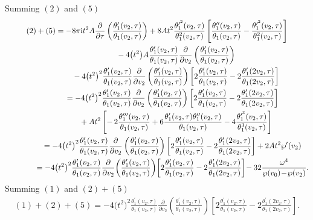 \documentclass[10pt,a4paper]{amsart}
\numberwithin{equation}{section}
\begin{document}
Summing $(2)$ and $(5)$
\begin{gather*}
(2)+(5)=-8\pi {\rm i}t^2A\frac{\partial}{\partial \tau}\left(\frac{\theta_1^{\prime}(v_2,\tau)}{\theta_1(v_2,\tau)}\right) +8At^2\frac{\theta_1^{\prime^2}(v_2,\tau)}{\theta_1^2(v_2,\tau)} \left[\frac{\theta_1^{\prime\prime}(v_2,\tau)}{\theta_1(v_2,\tau)} -\frac{\theta_1^{\prime^2}(v_2,\tau)}{\theta_1^2(v_2,\tau)}\right]
\\ \hphantom{(2)+(5)=}
-4\big(t^2\big)A\frac{\theta_1^{\prime}(v_2,\tau)}{\theta_1(v_2,\tau)}\frac{\partial}{\partial v_2}\left(\frac{\theta_1^{\prime}(v_2,\tau)}{\theta_1(v_2,\tau)}\right)
\\ \hphantom{(2)+(5)=}
-4\big(t^2\big)^2\frac{\theta_1^{\prime}(v_2,\tau)}{\theta_1(v_2,\tau)}\frac{\partial}{\partial v_2}\left(\frac{\theta_1^{\prime}(v_2,\tau)}{\theta_1(v_2,\tau)}\right)\left[ 2\frac{\theta_1^{\prime}(v_2,\tau)}{\theta_1(v_2,\tau)} -2\frac{\theta_1^{\prime}(2v_2,\tau)}{\theta_1(2v_2,\tau)}\right]
\\ \hphantom{(2)+(5)}
=-4\big(t^2\big)^2\frac{\theta_1^{\prime}(v_2,\tau)}{\theta_1(v_2,\tau)}\frac{\partial}{\partial v_2}\left(\frac{\theta_1^{\prime}(v_2,\tau)}{\theta_1(v_2,\tau)}\right)\left[ 2\frac{\theta_1^{\prime}(v_2,\tau)}{\theta_1(v_2,\tau)} -2\frac{\theta_1^{\prime}(2v_2,\tau)}{\theta_1(2v_2,\tau)}\right]
\\ \hphantom{(2)+(5)=}
+At^2\left[{-}\,2\frac{\theta_1^{\prime\prime\prime}(v_2,\tau)}{\theta_1(v_2,\tau)} +6\frac{\theta_1^{\prime}(v_2,\tau)\theta_1^{\prime\prime}(v_2,\tau)}{\theta_1(v_2,\tau)} -4\frac{\theta_1^{\prime^3}(v_2,\tau)}{\theta^3_1(v_2,\tau)}\right]
\\ \hphantom{(2)+(5)}
=-4\big(t^2\big)^2\frac{\theta_1^{\prime}(v_2,\tau)}{\theta_1(v_2,\tau)}\frac{\partial}{\partial v_2}\left(\frac{\theta_1^{\prime}(v_2,\tau)}{\theta_1(v_2,\tau)}\right)\left[ 2\frac{\theta_1^{\prime}(v_2,\tau)}{\theta_1(v_2,\tau)} -2\frac{\theta_1^{\prime}(2v_2,\tau)}{\theta_1(2v_2,\tau)}\right]
+2At^2\wp^{\prime}(v_2)
\\ \hphantom{(2)+(5)}
=-4\big(t^2\big)^2\frac{\theta_1^{\prime}(v_2,\tau)}{\theta_1(v_2,\tau)}\frac{\partial}{\partial v_2}\!\left(\frac{\theta_1^{\prime}(v_2,\tau)}{\theta_1(v_2,\tau)}\right)\!\left[ 2\frac{\theta_1^{\prime}(v_2,\tau)}{\theta_1(v_2,\tau)} -2\frac{\theta_1^{\prime}(2v_2,\tau)}{\theta_1(2v_2,\tau)}\right]\!
-32\frac{\omega^4}{\wp(v_0)\!-\!\wp(v_2)}.
\end{gather*}
Summing $(1)$ and $(2)+(5)$
\begin{gather*}
(1)+(2)+(5)=-4\big(t^2\big)^2\frac{\theta_1^{\prime}(v_2,\tau)}{\theta_1(v_2,\tau)}\frac{\partial}{\partial v_2}\left(\frac{\theta_1^{\prime}(v_2,\tau)}{\theta_1(v_2,\tau)}\right)\left[ 2\frac{\theta_1^{\prime}(v_2,\tau)}{\theta_1(v_2,\tau)} -2\frac{\theta_1^{\prime}(2v_2,\tau)}{\theta_1(2v_2,\tau)}\right].
\end{gather*}
\end{document}

